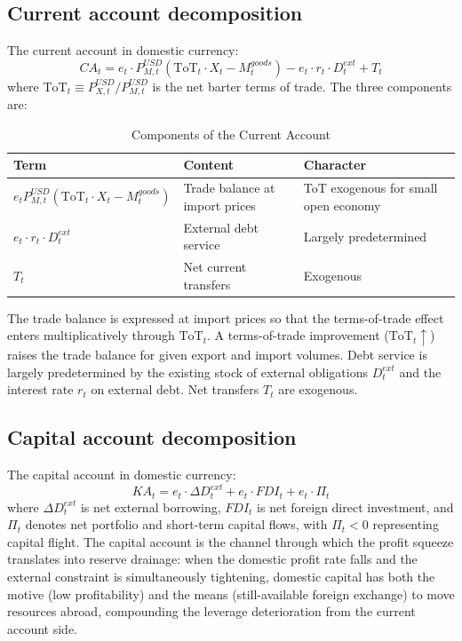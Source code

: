 \subsection{Current account decomposition}
\label{app:current_account}

The current account in domestic currency:
%
\begin{equation}
\label{app:eq:CA}
CA_t = e_t \cdot P_{M,t}^{USD}\!\left(\text{ToT}_t \cdot X_t
       - M_t^{goods}\right)
       - e_t \cdot r_t \cdot D_t^{ext} + T_t
\end{equation}
%
where $\text{ToT}_t \equiv P_{X,t}^{USD} / P_{M,t}^{USD}$ is the net
barter terms of trade. The three components are:

\begin{table}[h]
\centering
\small
\caption{Components of the Current Account}
\begin{tabular}{lll}
\toprule
Term & Content & Character \\
\midrule
$e_t P_{M,t}^{USD}(\text{ToT}_t \cdot X_t - M_t^{goods})$
  & Trade balance at import prices
  & ToT exogenous for small open economy \\
$e_t \cdot r_t \cdot D_t^{ext}$
  & External debt service
  & Largely predetermined \\
$T_t$
  & Net current transfers
  & Exogenous \\
\bottomrule
\end{tabular}
\label{app:tab:CA}
\end{table}

The trade balance is expressed at import prices so that the terms-of-trade
effect enters multiplicatively through $\text{ToT}_t$. A terms-of-trade
improvement ($\text{ToT}_t \uparrow$) raises the trade balance for given
export and import volumes. Debt service is largely predetermined by the
existing stock of external obligations $D_t^{ext}$ and the interest rate
$r_t$ on external debt. Net transfers $T_t$ are exogenous.


\subsection{Capital account decomposition}
\label{app:capital_account}

The capital account in domestic currency:
%
\begin{equation}
\label{app:eq:KA}
KA_t = e_t \cdot \Delta D_t^{ext} + e_t \cdot FDI_t + e_t \cdot \Pi_t
\end{equation}
%
where $\Delta D_t^{ext}$ is net external borrowing, $FDI_t$ is net foreign
direct investment, and $\Pi_t$ denotes net portfolio and short-term capital
flows, with $\Pi_t < 0$ representing capital flight. The capital account
is the channel through which the profit squeeze translates into reserve
drainage: when the domestic profit rate falls and the external constraint
is simultaneously tightening, domestic capital has both the motive (low
profitability) and the means (still-available foreign exchange) to move
resources abroad, compounding the leverage deterioration from the current
account side.



